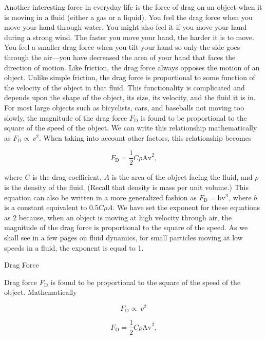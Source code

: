 \documentclass[
]{book}
\begin{document}
Another interesting force in everyday life is the force of drag on an
object when it is moving in a fluid (either a gas or a liquid). You feel
the drag force when you move your hand through water. You might also
feel it if you move your hand during a strong wind. The faster you move
your hand, the harder it is to move. You feel a smaller drag force when
you tilt your hand so only the side goes through the air---you have
decreased the area of your hand that faces the direction of motion. Like
friction, the \protect\hypertarget{import-auto-id1165298930276}{}{drag force} always opposes the motion of an object. Unlike simple
friction, the drag force is proportional to some function of the
velocity of the object in that fluid. This functionality is complicated
and depends upon the shape of the object, its size, its velocity, and
the fluid it is in. For most large objects such as bicyclists, cars, and
baseballs not moving too slowly, the magnitude of the drag force
\(F_{\text{D}}{}\) is found to be proportional to the square of the speed
of the object. We can write this relationship mathematically as
\emph{\({F_{\text{D}} \propto \, v^{2}}{}\)}. When taking into account other
factors, this relationship becomes

\leavevmode{}%
\[{{F_{\text{D}} =}\frac{1}{2}C\rho\text{Av}^{2}}{}\text{,}\]

where \(C{}\) is the drag coefficient, \(A{}\) is the area of the object
facing the fluid, and \(\rho{}\) is the density of the fluid. (Recall that
density is mass per unit volume.) This equation can also be written in a
more generalized fashion as \({F_{\text{D}} = \text{bv}^{n}}{}\), where
\(b{}\)\emph{} is a constant equivalent to
\({0\text{.5}{C\rho A}}{}\). We have set the exponent for these equations
as 2 because, when an object is moving at high velocity through air, the
magnitude of the drag force is proportional to the square of the speed.
As we shall see in a few pages on fluid dynamics, for small particles
moving at low speeds in a fluid, the exponent is equal to 1.

\hypertarget{fs-id1165298785006}{}
Drag Force

Drag force \(F_{\text{D}}{}\) is found to be proportional to the square of
the speed of the object. Mathematically

\leavevmode{}%
\[{F_{\text{D}} \propto \ v^{2}}{}\]

\leavevmode{}%
\[{{F_{\text{D}} =}\frac{1}{2}{C\rho}\text{Av}^{2}}{}\text{,}\]
\end{document}
